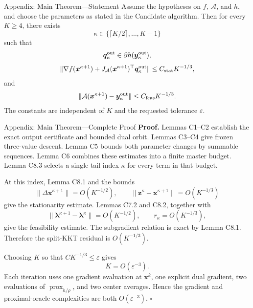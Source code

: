 \documentclass[handout,compress,9pt]{beamer}
\newcommand{\bx}{\bm{x}}
\newcommand{\by}{\bm{y}}
\newcommand{\bz}{\bm{z}}
\newcommand{\bq}{\bm{q}}
\newcommand{\blmbd}{\bm{\lambda}}
\newcommand{\calA}{\mathcal{A}}
\newcommand{\prox}{\operatorname{prox}}
\newcommand{\eps}{\varepsilon}
\begin{document}
\begin{frame}{Appendix: Main Theorem---Statement
\hfill\hyperlink{appendix:contents}{}}
\hypertarget{appendix:candidate-main-theorem}{}
\small
Assume the hypotheses on $f$, $\calA$, and $h$, and choose the parameters as
stated in the Candidate algorithm.  Then for every $K\ge4$, there exists
\begin{equation*}
  \kappa\in\{\lceil K/2\rceil,\ldots,K-1\}
\end{equation*}
such that
\begin{equation*}
  \bq_\kappa^{\rm out}\in\partial h(\by_\kappa^{\rm out}),
\end{equation*}
\begin{equation*}
  \|\nabla f(\bx^{\kappa+1})
  +J_{\calA}(\bx^{\kappa+1})^\top\bq_\kappa^{\rm out}\|
  \le C_{\rm stat}K^{-1/3},
\end{equation*}
and
\begin{equation*}
  \|\calA(\bx^{\kappa+1})-\by_\kappa^{\rm out}\|
  \le C_{\rm feas}K^{-1/3}.
\end{equation*}
The constants are independent of $K$ and the requested tolerance $\eps$.
\end{frame}

\begin{frame}{Appendix: Main Theorem---Complete Proof
\hfill\hyperlink{appendix:contents}{}}
\scriptsize
\noindent\textbf{Proof.}
Lemmas C1--C2 establish the exact output certificate and bounded dual orbit.
Lemmas C3--C4 give frozen three-value descent.  Lemma C5 bounds both parameter
changes by summable sequences.  Lemma C6 combines these estimates into a finite
master budget.  Lemma C8.3 selects a single tail index $\kappa$ for every term
in that budget.

At this index, Lemma C8.1 and the bounds
\begin{equation*}
  \|\Delta\bx^{\kappa+1}\|=O(K^{-1/2}),
  \qquad
  \|\bz^\kappa-\bx^{\kappa+1}\|=O(K^{-1/3})
\end{equation*}
give the stationarity estimate.  Lemmas C7.2 and C8.2, together with
\begin{equation*}
  \|\blmbd^{\kappa+1}-\blmbd^\kappa\|=O(K^{-1/2}),
  \qquad r_\kappa=O(K^{-1/3}),
\end{equation*}
give the feasibility estimate.  The subgradient relation is exact by
Lemma C8.1.  Therefore the split-KKT residual is $O(K^{-1/3})$.

Choosing $K$ so that $C K^{-1/3}\le\eps$ gives
\begin{equation*}
  K=O(\eps^{-3}).
\end{equation*}
Each iteration uses one gradient evaluation at $\bx^k$, one explicit dual
gradient, two evaluations of $\prox_{h/\rho}$, and two center averages.  Hence
the gradient and proximal-oracle complexities are both $O(\eps^{-3})$.
\hfill$\square$
\end{frame}
\end{document}
